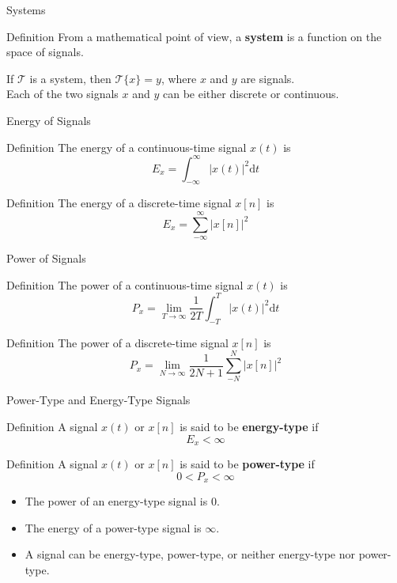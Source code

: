 \documentclass[aspectratio=169]{beamer}
\begin{document}
\begin{frame}{Systems}
	\begin{block}{Definition}
		From a mathematical point of view, a \textbf{system} is a function on the space of signals.
	\end{block}
	\vspace{1cm}
	If	$ \mathcal{T} $ is a system, then $ \mathcal{T}\{x\} = y$, where $ x $ and $ y $ are signals.\\
	\vspace{1cm}
	Each of the two signals $ x $ and $ y $ can be either discrete or continuous.
\end{frame}

\begin{frame}{Energy of Signals}
	\begin{block}{Definition}
		The energy of a continuous-time signal $ x(t) $ is
		\[E_x = \int_{-\infty}^{\infty}\left|x(t)\right|^2\mathrm{d}t\]
	\end{block}

	\begin{block}{Definition}
		The energy of a discrete-time signal $ x[n] $ is
		\[E_x = \sum_{-\infty}^{\infty}\left|x[n]\right|^2\]
	\end{block}
\end{frame}

\begin{frame}{Power of Signals}
	\begin{block}{Definition}
		The power of a continuous-time signal $ x(t) $ is
		\[P_x = \lim\limits_{T\to\infty}\frac{1}{2T}\int_{-T}^{T}\left|x(t)\right|^2\mathrm{d}t\]
	\end{block}
	
	\begin{block}{Definition}
		The power of a discrete-time signal $ x[n] $ is
		\[P_x = \lim\limits_{N\to\infty}\frac{1}{2N+1}\sum_{-N}^{N}\left|x[n]\right|^2\]
	\end{block}
\end{frame}

\begin{frame}{Power-Type and Energy-Type Signals}
	\begin{block}{Definition}
		A signal $ x(t) $ or $ x[n] $ is said to be \textbf{energy-type} if 
		\[E_x < \infty\]
	\end{block}

	\begin{block}{Definition}
		A signal $ x(t) $ or $ x[n] $ is said to be \textbf{power-type} if 
		\[0 < P_x < \infty\]
	\end{block}
\begin{itemize}
	\item The power of an energy-type signal is $ 0 $.
	\item The energy of a power-type signal is $ \infty $.
	\item A signal can be energy-type, power-type, or neither energy-type nor power-type.
\end{itemize}
\end{frame}
\end{document}
